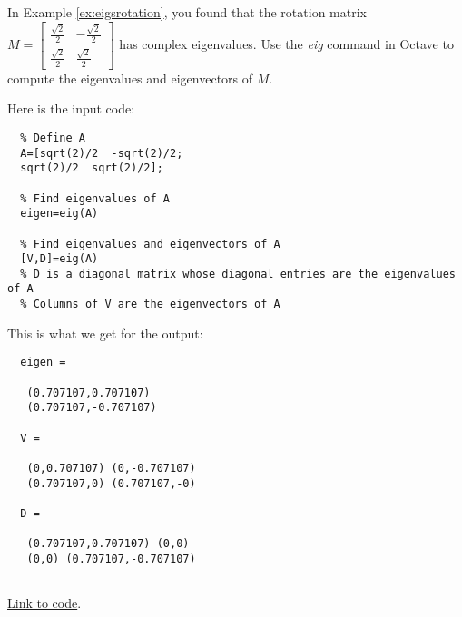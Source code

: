 \documentclass{ximera}
\begin{document}
  \begin{example}\label{ex:complexEig}
  In Example \ref{ex:eigsrotation}, you found that the rotation matrix $M=\begin{bmatrix}
  \frac{\sqrt{2}}{2} & -\frac{\sqrt{2}}{2}\\
  \frac{\sqrt{2}}{2} & \frac{\sqrt{2}}{2}
  \end{bmatrix}$ has complex eigenvalues.  Use the \emph{eig} command in Octave to compute the eigenvalues and eigenvectors of $M$.  
  
  \begin{explanation}
  Here is the input code:
  
  \begin{verbatim}
  % Define A
  A=[sqrt(2)/2  -sqrt(2)/2;
  sqrt(2)/2  sqrt(2)/2];
  
  % Find eigenvalues of A
  eigen=eig(A)
  
  % Find eigenvalues and eigenvectors of A
  [V,D]=eig(A)
  % D is a diagonal matrix whose diagonal entries are the eigenvalues of A
  % Columns of V are the eigenvectors of A
  \end{verbatim}
  
  This is what we get for the output:
  \begin{verbatim}
  eigen =
  
   (0.707107,0.707107)
   (0.707107,-0.707107)
  
  V =
  
   (0,0.707107) (0,-0.707107)
   (0.707107,0) (0.707107,-0)
  
  D =
  
   (0.707107,0.707107) (0,0)
   (0,0) (0.707107,-0.707107) 
   
  \end{verbatim}
  
  \href{https://sagecell.sagemath.org/?z=eJx1jkEKgzAURPeB3GE2AYWWgtviQio9ghtxEepXAzHBGNsev1FoKqXdfOY_ZoYRKKlThlBwVuT1PDmfZOkpA45Rnznb8SibwDkTuCrTglRP5i71QjNst7ZtJA83KdI_Rhl_unnr3sm6OpRNTAqUUMGLVsneGqkxSu_UE4_BzvShZAJdSx3BD_RjkcDF6mU02199GXcLXu8oVg4=&lang=octave&interacts=eJyLjgUAARUAuQ==}{Link to code}.
  

\end{explanation}
\end{example}
\end{document}
